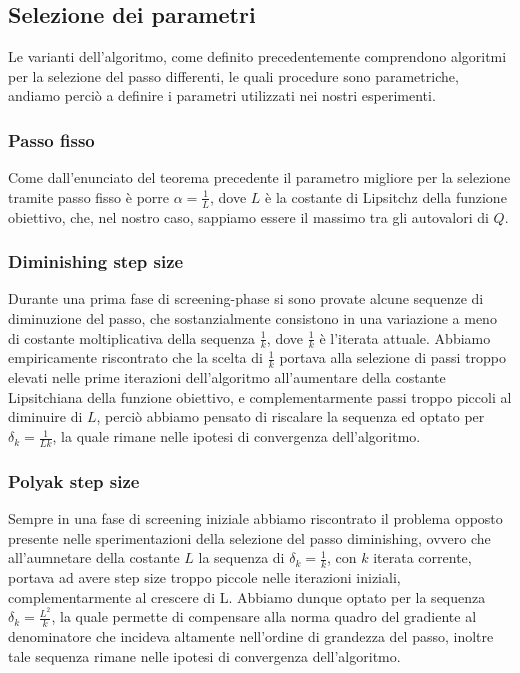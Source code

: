 \documentclass[12pt]{extarticle}
\begin{document}
\subsection{Selezione dei parametri}
Le varianti dell'algoritmo, come definito precedentemente comprendono algoritmi per la selezione del passo differenti, le quali procedure sono parametriche, andiamo perciò a definire i parametri utilizzati nei nostri esperimenti.
\subsubsection{Passo fisso}
Come dall'enunciato del teorema precedente il parametro migliore per la selezione tramite passo fisso è porre $\alpha = \frac{1}{L}$, dove $L$ è la costante di Lipsitchz della funzione obiettivo, che, nel nostro caso, sappiamo essere il massimo tra gli autovalori di $Q$.
\subsubsection{Diminishing step size}
Durante una prima fase di screening-phase si sono provate alcune sequenze di diminuzione del passo, che sostanzialmente consistono in una variazione a meno di costante moltiplicativa della sequenza $\frac{1}{k}$, dove $\frac{1}{k}$ è l'iterata attuale. Abbiamo empiricamente riscontrato che la scelta di $\frac{1}{k}$ portava alla selezione di passi troppo elevati nelle prime iterazioni dell'algoritmo all'aumentare della costante Lipsitchiana della funzione obiettivo, e complementarmente passi troppo piccoli al diminuire di $L$, perciò abbiamo pensato di riscalare la sequenza ed optato per $\delta_k = \frac{1}{Lk}$, la quale rimane nelle ipotesi di convergenza dell'algoritmo.
\subsubsection{Polyak step size}
Sempre in una fase di screening iniziale abbiamo riscontrato il problema opposto presente nelle sperimentazioni della selezione del passo diminishing, ovvero che all'aumnetare della costante $L$ la sequenza di $\delta_k = \frac{1}{k}$, con $k$ iterata corrente, portava ad avere step size troppo piccole nelle iterazioni iniziali, complementarmente al crescere di L. Abbiamo dunque optato per la sequenza $\delta_k = \frac{L^2}{k}$, la quale permette di compensare alla norma quadro del gradiente al denominatore che incideva altamente nell'ordine di grandezza del passo, inoltre tale sequenza rimane nelle ipotesi di convergenza dell'algoritmo.
\end{document}
